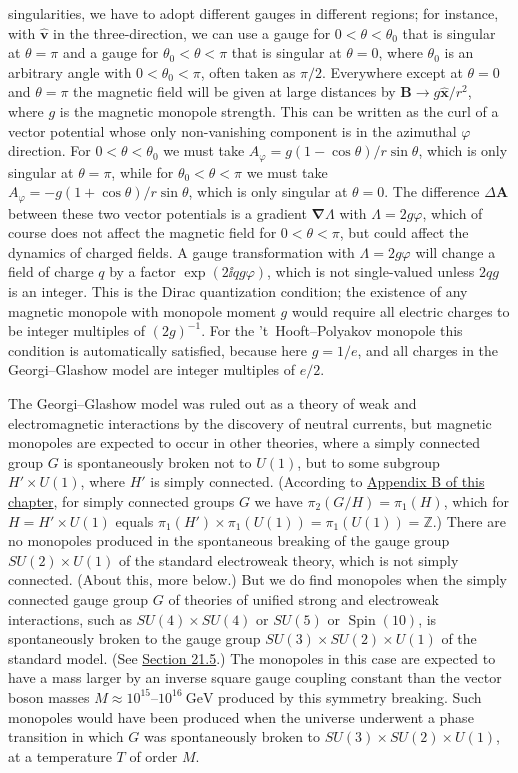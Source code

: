 singularities, we have to adopt different gauges in different regions; for
instance, with $\hat{\mathbf v}$ in the three-direction, we can use a gauge
for $0<\theta<\theta_0$ that is singular at $\theta=\pi$ and a gauge for
$\theta_0<\theta<\pi$ that is singular at $\theta=0$, where $\theta_0$ is
an arbitrary angle with $0<\theta_0<\pi$, often taken as $\pi/2$.
Everywhere except at $\theta=0$ and $\theta=\pi$ the magnetic field will
be given at large distances by
$\mathbf B\to g\hat{\mathbf x}/r^2$, where $g$ is the magnetic monopole
strength. This can be written as the curl of a vector potential whose only
non-vanishing component is in the azimuthal $\varphi$ direction. For
$0<\theta<\theta_0$ we must take
$A_\varphi=g(1-\cos\theta)/r\sin\theta$, which is only singular at
$\theta=\pi$, while for $\theta_0<\theta<\pi$ we must take
$A_\varphi=-g(1+\cos\theta)/r\sin\theta$, which is only singular at
$\theta=0$. The difference $\Delta\mathbf A$ between these two vector
potentials is a gradient $\boldsymbol\nabla\Lambda$ with
$\Lambda=2g\varphi$, which of course does not affect the magnetic field
for $0<\theta<\pi$, but could affect the dynamics of charged fields. A
gauge transformation with $\Lambda=2g\varphi$ will change a field of
charge $q$ by a factor $\exp(2\ii qg\varphi)$, which is not single-valued
unless $2qg$ is an integer. This is the Dirac quantization condition; the
existence of any magnetic monopole with monopole moment $g$ would require
all electric charges to be integer multiples of $(2g)^{-1}$. For the
't~Hooft--Polyakov monopole this condition is automatically satisfied,
because here $g=1/e$, and all charges in the Georgi--Glashow model are
integer multiples of $e/2$.

The Georgi--Glashow model was ruled out as a theory of weak and
electromagnetic interactions by the discovery of neutral currents, but
magnetic monopoles are expected to occur in other theories, where a simply
connected group $G$ is spontaneously broken not to $U(1)$, but to some
subgroup $H'\times U(1)$, where $H'$ is simply connected. (According to
\hyperref[app:23.B]{Appendix B of this chapter}, for simply connected
groups $G$ we have $\pi_2(G/H)=\pi_1(H)$, which for
$H=H'\times U(1)$ equals
$\pi_1(H')\times\pi_1(U(1))=\pi_1(U(1))=\mathbb Z$.) There are no
monopoles produced in the spontaneous breaking of the gauge group
$SU(2)\times U(1)$ of the standard electroweak theory, which is not simply
connected. (About this, more below.) But we do find monopoles when the
simply connected gauge group $G$ of theories of unified strong and
electroweak interactions, such as $SU(4)\times SU(4)$ or $SU(5)$ or
$\operatorname{Spin}(10)$, is spontaneously broken to the gauge group
$SU(3)\times SU(2)\times U(1)$ of the standard model. (See
\hyperref[sec:21.5]{Section 21.5}.) The monopoles in this case are expected
to have a mass larger by an inverse square gauge coupling constant than
the vector boson masses $M\approx10^{15}$--$10^{16}\ \mathrm{GeV}$
produced by this symmetry breaking. Such monopoles would have been
produced when the universe underwent a phase transition in which $G$ was
spontaneously broken to $SU(3)\times SU(2)\times U(1)$, at a temperature
$T$ of order $M$.


